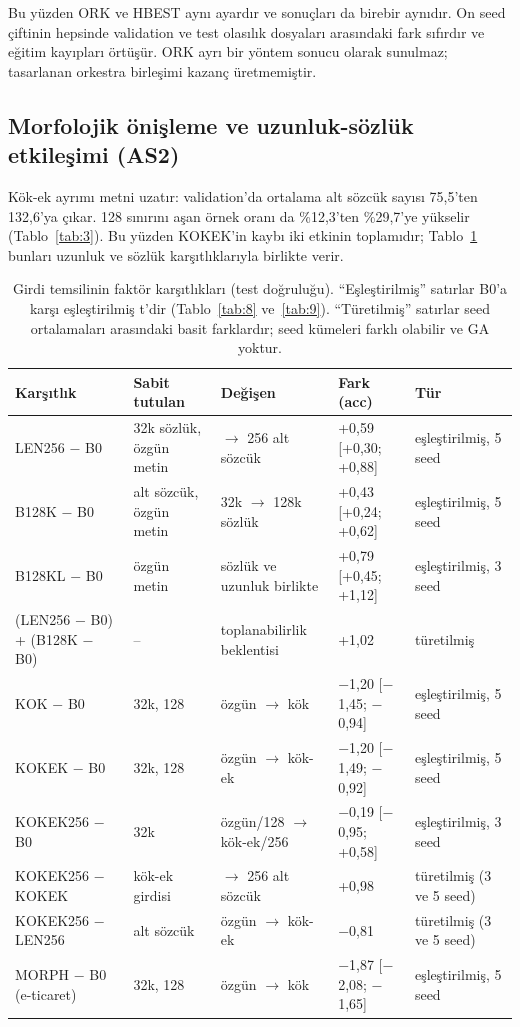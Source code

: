 \documentclass[11pt]{article}
\begin{document}
Bu yüzden ORK ve HBEST aynı ayardır ve sonuçları da birebir aynıdır. On seed çiftinin hepsinde validation ve test olasılık dosyaları arasındaki fark sıfırdır ve eğitim kayıpları örtüşür. ORK ayrı bir yöntem sonucu olarak sunulmaz; tasarlanan orkestra birleşimi kazanç üretmemiştir.

\subsection{Morfolojik önişleme ve uzunluk-sözlük etkileşimi (AS2)}

Kök-ek ayrımı metni uzatır: validation'da ortalama alt sözcük sayısı 75,5'ten 132,6'ya çıkar. 128 sınırını aşan örnek oranı da \%12,3'ten \%29,7'ye yükselir (Tablo~\ref{tab:3}). Bu yüzden KOKEK'in kaybı iki etkinin toplamıdır; Tablo~\ref{tab:15} bunları uzunluk ve sözlük karşıtlıklarıyla birlikte verir.

\begin{table}[!htbp]
\centering
\footnotesize
\setlength{\tabcolsep}{3pt}
\begin{tabularx}{\textwidth}{l>{\raggedright\arraybackslash}X>{\raggedright\arraybackslash}Xl>{\raggedright\arraybackslash}X}
\toprule
Karşıtlık & Sabit tutulan & Değişen & Fark (acc) & Tür \\
\midrule
LEN256 $-$ B0 & 32k sözlük, özgün metin & 128 $\rightarrow$ 256 alt sözcük & +0,59 [+0,30; +0,88] & eşleştirilmiş, 5 seed \\
B128K $-$ B0 & 128 alt sözcük, özgün metin & 32k $\rightarrow$ 128k sözlük & +0,43 [+0,24; +0,62] & eşleştirilmiş, 5 seed \\
B128KL $-$ B0 & özgün metin & sözlük ve uzunluk birlikte & +0,79 [+0,45; +1,12] & eşleştirilmiş, 3 seed \\
(LEN256 $-$ B0) + (B128K $-$ B0) & – & toplanabilirlik beklentisi & +1,02 & türetilmiş \\
KOK $-$ B0 & 32k, 128 & özgün $\rightarrow$ kök & $-$1,20 [$-$1,45; $-$0,94] & eşleştirilmiş, 5 seed \\
KOKEK $-$ B0 & 32k, 128 & özgün $\rightarrow$ kök-ek & $-$1,20 [$-$1,49; $-$0,92] & eşleştirilmiş, 5 seed \\
KOKEK256 $-$ B0 & 32k & özgün/128 $\rightarrow$ kök-ek/256 & $-$0,19 [$-$0,95; +0,58] & eşleştirilmiş, 3 seed \\
KOKEK256 $-$ KOKEK & kök-ek girdisi & 128 $\rightarrow$ 256 alt sözcük & +0,98 & türetilmiş (3 ve 5 seed) \\
KOKEK256 $-$ LEN256 & 256 alt sözcük & özgün $\rightarrow$ kök-ek & $-$0,81 & türetilmiş (3 ve 5 seed) \\
MORPH $-$ B0 (e-ticaret) & 32k, 128 & özgün $\rightarrow$ kök & $-$1,87 [$-$2,08; $-$1,65] & eşleştirilmiş, 5 seed \\
\bottomrule
\end{tabularx}
\caption{Girdi temsilinin faktör karşıtlıkları (test doğruluğu). ``Eşleştirilmiş'' satırlar B0'a karşı eşleştirilmiş t'dir (Tablo~\ref{tab:8} ve~\ref{tab:9}). ``Türetilmiş'' satırlar seed ortalamaları arasındaki basit farklardır; seed kümeleri farklı olabilir ve GA yoktur.}
\label{tab:15}
\end{table}
\end{document}
